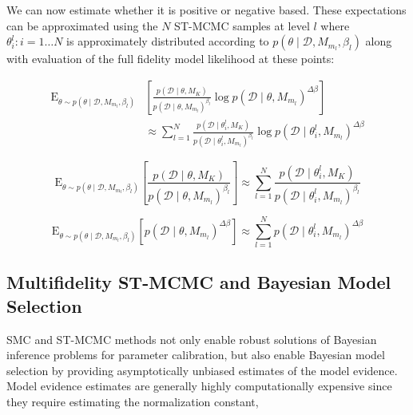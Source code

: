 \documentclass[1p]{article}
\begin{document}
\noindent We can now estimate whether it is positive or negative based. These expectations can be approximated using the $N$ ST-MCMC samples at level $l$ where ${\theta^l_{i}: i = 1 \dots N}$ is approximately distributed according to $ p \left (\theta \mid \mathcal{D}, M_{m_l}, \beta_l \right )$ along with evaluation of the full fidelity model likelihood at these points:

\begin{equation}
\begin{split}
\text{E}_{\theta \sim p \left (\theta \mid \mathcal{D}, M_{m_l}, \beta_l \right )} &\left [ \frac{p \left (\mathcal{D} \mid \theta, M_K \right )}{p \left (\mathcal{D} \mid \theta, M_{m_l} \right )^{\beta_l}} \log p \left (\mathcal{D} \mid \theta, M_{m_l} \right )^{\Delta \beta} \right ]\\
& \approx \sum_{l=1}^{N} \frac{p \left (\mathcal{D} \mid \theta^l_i, M_K \right )}{p \left (\mathcal{D} \mid \theta^l_i, M_{m_l} \right )^{\beta_l}} \log p \left (\mathcal{D} \mid \theta^l_i, M_{m_l} \right )^{\Delta \beta}
\end{split}
\end{equation}

\begin{equation}
\text{E}_{\theta \sim p \left (\theta \mid \mathcal{D}, M_{m_l}, \beta_l \right )} \left [ \frac{p \left (\mathcal{D} \mid \theta, M_K \right )}{p \left (\mathcal{D} \mid \theta, M_{m_l} \right )^{\beta_l}} \right ] \approx \sum_{l=1}^{N} \frac{p \left (\mathcal{D} \mid \theta^l_i, M_K \right )}{p \left (\mathcal{D} \mid \theta^l_i, M_{m_l} \right )^{\beta_l}}
\end{equation}

\begin{equation}
\text{E}_{\theta \sim p \left (\theta \mid \mathcal{D}, M_{m_l}, \beta_l \right )} \left [ p \left (\mathcal{D} \mid \theta, M_{m_l} \right )^{\Delta \beta} \right ] \approx \sum_{l=1}^{N} p \left (\mathcal{D} \mid \theta^l_i, M_{m_l} \right )^{\Delta \beta}
\end{equation}

\subsection{Multifidelity ST-MCMC and Bayesian Model Selection}

SMC and ST-MCMC methods not only enable robust solutions of Bayesian inference problems for parameter calibration, but also enable Bayesian model selection by providing asymptotically unbiased estimates of the model evidence. Model evidence estimates are generally highly computationally expensive since they require estimating the normalization constant,
\end{document}

